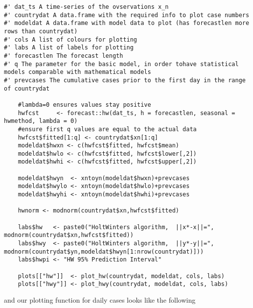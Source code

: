 \begin{lstlisting}[frame=single, caption = {Algorithm for HoltWinters Model}]
#' dat_ts A time-series of the ovservations x_n
#' countrydat A data.frame with the required info to plot case numbers
#' modeldat A data.frame with model data to plot (has forecastlen more rows than countrydat)
#' cols A list of colours for plotting
#' labs A list of labels for plotting
#' forecastlen The forecast length 
#' q The parameter for the basic model, in order tohave statistical models comparable with mathematical models
#' prevcases The cumulative cases prior to the first day in the range of countrydat

    #lambda=0 ensures values stay positive
    hwfcst     <- forecast::hw(dat_ts, h = forecastlen, seasonal = hwmethod, lambda = 0)
    #ensure first q values are equal to the actual data
    hwfcst$fitted[1:q] <- countrydat$xn[1:q]
    modeldat$hwxn <- c(hwfcst$fitted, hwfcst$mean)
    modeldat$hwlo <- c(hwfcst$fitted, hwfcst$lower[,2])
    modeldat$hwhi <- c(hwfcst$fitted, hwfcst$upper[,2])
    
    modeldat$hwyn  <- xntoyn(modeldat$hwxn)+prevcases
    modeldat$hwylo <- xntoyn(modeldat$hwlo)+prevcases
    modeldat$hwyhi <- xntoyn(modeldat$hwhi)+prevcases
    
    hwnorm <- modnorm(countrydat$xn,hwfcst$fitted)

    labs$hw   <- paste0("HoltWinters algorithm,  ||x*-x||=", modnorm(countrydat$xn,hwfcst$fitted))
    labs$hwy  <- paste0("HoltWinters algorithm,  ||y*-y||=", modnorm(countrydat$yn,modeldat$hwyn[1:nrow(countrydat)]))
    labs$hwpi <- "HW 95% Prediction Interval"
    
    plots[["hw"]]  <- plot_hw(countrydat, modeldat, cols, labs)
    plots[["hwy"]] <- plot_hwy(countrydat, modeldat, cols, labs)
\end{lstlisting}

and our plotting function for daily cases looks like the following

